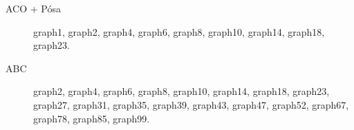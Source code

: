 \begin{description}
\item[ACO + Pósa] graph1, graph2, graph4, graph6, graph8, graph10, graph14, graph18, graph23.
\item[ABC] graph2, graph4, graph6, graph8, graph10, graph14, graph18, graph23, graph27, graph31, graph35, graph39, graph43, graph47, graph52, graph67, graph78, graph85, graph99.
\end{description}

